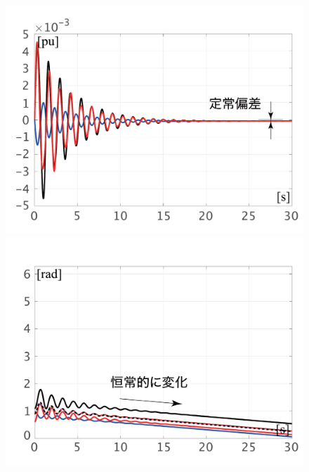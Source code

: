 \documentclass[graybox, envcountchap]{svmult}
\begin{document}
\begin{figure}[t]
  \centering
  {
  \begin{minipage}{0.49\linewidth}
    \centering
    \includegraphics[width = 1.0\linewidth]{figs/DomegaV}
    \medskip
  \end{minipage}
  \begin{minipage}{0.49\linewidth}
    \centering
    \includegraphics[width = 1.0\linewidth]{figs/delangVV}
    \medskip
  \end{minipage}
 \begin{minipage}{0.49\linewidth}
    \centering

\end{minipage}}
\end{figure}
\end{document}
